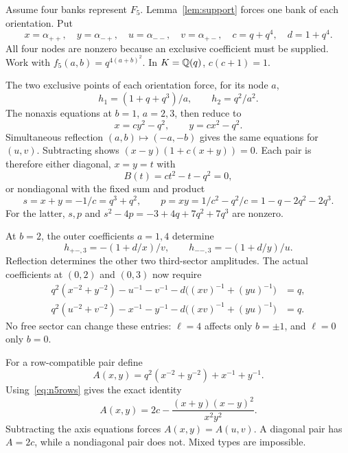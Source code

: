\documentclass[11pt,letterpaper]{article}
\theoremstyle{definition}\newtheorem{definition}[theorem]{Definition}
\begin{document}
Assume four banks represent $F_5$. Lemma~\ref{lem:support} forces one bank of each orientation. Put
\[
 x=\alpha_{++},\quad y=\alpha_{-+},\quad
 u=\alpha_{--},\quad v=\alpha_{+-},\quad
 c=q+q^4,\quad d=1+q^4.
\]
All four nodes are nonzero because an exclusive coefficient must be supplied. Work with $f_5(a,b)=q^{4(a+b)^2}$. In $K=\mathbb Q(q)$, $c(c+1)=1$.

The two exclusive points of each orientation force, for its node $a$,
\begin{equation}\label{eq:n5forced}
 h_1=(1+q+q^3)/a,\qquad h_2=q^2/a^2.
\end{equation}
The nonaxis equations at $b=1$, $a=2,3$, then reduce to
\begin{equation}\label{eq:n5rows}
 x=cy^2-q^2,\qquad y=cx^2-q^2.
\end{equation}
Simultaneous reflection $(a,b)\mapsto(-a,-b)$ gives the same equations for $(u,v)$. Subtracting shows
$(x-y)(1+c(x+y))=0$. Each pair is therefore either diagonal, $x=y=t$ with
\[
 B(t)=ct^2-t-q^2=0,
\]
or nondiagonal with the fixed sum and product
\begin{equation}\label{eq:n5sp}
 s=x+y=-1/c=q^3+q^2,\qquad
 p=xy=1/c^2-q^2/c=1-q-2q^2-2q^3.
\end{equation}
For the latter, $s,p$ and $s^2-4p=-3+4q+7q^2+7q^3$ are nonzero.

At $b=2$, the outer coefficients $a=1,4$ determine
\[
 h_{+-,3}=-(1+d/x)/v,\qquad
 h_{--,3}=-(1+d/y)/u.
\]
Reflection determines the other two third-sector amplitudes. The actual coefficients at $(0,2)$ and $(0,3)$ now require
\begin{align}
 q^2(x^{-2}+y^{-2})-u^{-1}-v^{-1}
 -d\bigl((xv)^{-1}+(yu)^{-1}\bigr)&=q,\label{eq:n5axis1}\\
 q^2(u^{-2}+v^{-2})-x^{-1}-y^{-1}
 -d\bigl((xv)^{-1}+(yu)^{-1}\bigr)&=q.\label{eq:n5axis2}
\end{align}
No free sector can change these entries: $\ell=4$ affects only $b=\pm1$, and $\ell=0$ only $b=0$.

For a row-compatible pair define
\[
 A(x,y)=q^2(x^{-2}+y^{-2})+x^{-1}+y^{-1}.
\]
Using~\eqref{eq:n5rows} gives the exact identity
\begin{equation}\label{eq:n5mixed}
 A(x,y)=2c-\frac{(x+y)(x-y)^2}{x^2y^2}.
\end{equation}
Subtracting the axis equations forces $A(x,y)=A(u,v)$. A diagonal pair has $A=2c$, while a nondiagonal pair does not. Mixed types are impossible.
\end{document}
